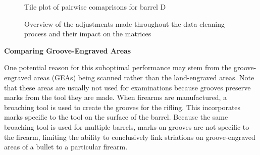 \documentclass[
  12pt]{article}
\begin{document}
\begin{figure}


\caption{\label{fig-matrixD}Tile plot of pairwise comaprisons for barrel
D}

\end{figure}%

\begin{figure}


\caption{\label{fig-matrixDAdjustments}Overview of the adjustments made
throughout the data cleaning process and their impact on the matrices}

\end{figure}%

\textbf{Comparing Groove-Engraved Areas}

One potential reason for this suboptimal performance may stem from the
groove-engraved areas (GEAs) being scanned rather than the land-engraved
areas. Note that these areas are usually not used for examinations
because grooves preserve marks from the tool they are made. When
firearms are manufactured, a broaching tool is used to create the
grooves for the rifling. This incorporates marks specific to the tool on
the surface of the barrel. Because the same broaching tool is used for
multiple barrels, marks on grooves are not specific to the firearm,
limiting the ability to conclusively link striations on groove-engraved
areas of a bullet to a particular firearm.
\end{document}
